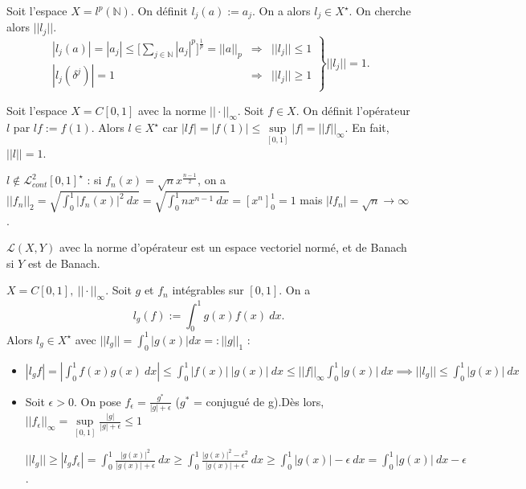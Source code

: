 \begin{example}
    Soit l'espace $X=l^p(\mathbb{N})$. On définit $l_j(a) := a_j$. On a alors $l_j\in X^\star$. On cherche alors $||l_j||$.
    \begin{equation*}
        \left.\begin{array}{rcl}
            |l_j(a)| = |a_j| \leq \big[\sum \limits_{j\in\mathbb{N}} |a_j|^p\big]^\frac{1}{p} = ||a||_p & \Rightarrow & ||l_j|| \leq 1 \\
            |l_j(\delta^j)| = 1 & \Rightarrow & ||l_j|| \geq 1
        \end{array}\right\} ||l_j|| = 1.
    \end{equation*}
\end{example}

\begin{example}
    Soit l'espace $X=C[0,1]$ avec la norme $||\cdot||_\infty$. Soit $f\in X$. On définit l'opérateur $l$ par $lf := f(1)$. Alors $l\in X^\star$ car $|lf|=|f(1)|\leq \sup \limits_{[0,1]}|f| = ||f||_\infty$. En fait, $||l|| = 1$.
    
    $l \not\in \mathcal{L}^2_{cont}[0,1]^\star$ : si $f_n(x) = \sqrt{n}x^{\frac{n-1}{2}}$, on a $||f_n||_2 = \sqrt{\int_0^1|f_n(x)|^2 \ dx} = \sqrt{\int_0^1 nx^{n-1} \ dx} = [x^n]_0^1=1$ mais $|lf_n| = \sqrt{n}\to \infty$.
\end{example}

\begin{theo}
    $\mathcal{L}(X,Y)$ avec la norme d'opérateur est un espace vectoriel normé, et de Banach si $Y$ est de Banach.
\end{theo}

\begin{example}
    $X = C[0,1],\ ||\cdot||_\infty$. Soit $g$ et $f_n$ intégrables sur $[0,1]$. On a
    \begin{equation*}
        l_g(f) := \int_0^1 g(x)f(x)\ dx.
    \end{equation*}
    Alors $l_g\in X^\star$ avec $||l_g|| = \int_0^1 |g(x)|dx =: ||g||_1$ :
    \begin{itemize}
        \item $|l_gf| = |\int_0^1 f(x)g(x) \ dx| \leq \int_0^1|f(x)|\ |g(x)| \ dx \leq ||f||_\infty \int_0^1|g(x)| \ dx \implies ||l_g||\leq\int_0^1|g(x)|\ dx$
        \item Soit $\epsilon>0$. On pose $f_\epsilon=\frac{g^*}{|g|+\epsilon}$ ($g^*$ = conjugué de g).Dès lors, $||f_\epsilon||_\infty = \sup\limits_{[0,1]} \frac{|g|}{|g|+\epsilon}\leq1$
        
        $||l_g|| \geq |l_gf_\epsilon| = \int_0^1\frac{|g(x)|^2}{|g(x)|+\epsilon}\ dx \geq \int_0^1 \frac{|g(x)|^2-\epsilon^2}{|g(x)|+\epsilon}\ dx \geq \int_0^1 |g(x)|-\epsilon\ dx = \int_0^1 |g(x)| \ dx - \epsilon$.
    \end{itemize}
\end{example}



